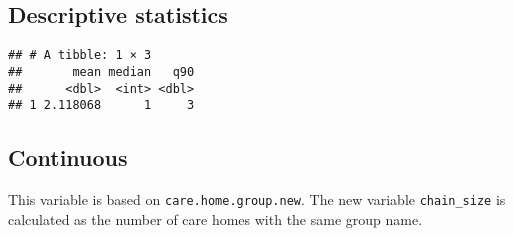 \documentclass[]{article}
\newenvironment{Shaded}{\begin{snugshade}}{\end{snugshade}}
\newcommand{\KeywordTok}[1]{\textcolor[rgb]{0.13,0.29,0.53}{\textbf{{#1}}}}
\newcommand{\DataTypeTok}[1]{\textcolor[rgb]{0.13,0.29,0.53}{{#1}}}
\newcommand{\FloatTok}[1]{\textcolor[rgb]{0.00,0.00,0.81}{{#1}}}
\newcommand{\StringTok}[1]{\textcolor[rgb]{0.31,0.60,0.02}{{#1}}}
\newcommand{\NormalTok}[1]{{#1}}
\begin{document}
\begin{Shaded}
\end{Shaded}

\subsection{Descriptive statistics}\label{descriptive-statistics}

\begin{Shaded}
\end{Shaded}

\begin{verbatim}
## # A tibble: 1 × 3
##       mean median   q90
##      <dbl>  <int> <dbl>
## 1 2.118068      1     3
\end{verbatim}

\subsection{Continuous}\label{continuous}

This variable is based on \texttt{care.home.group.new}. The new variable
\texttt{chain\_size} is calculated as the number of care homes with the
same group name.

\begin{Shaded}
\end{Shaded}
\end{document}
